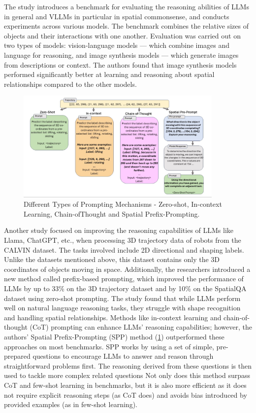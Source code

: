 The study \cite{liu2022things} introduces a benchmark for evaluating the reasoning abilities of LLMs in general and VLLMs in particular in spatial commonsense, and conducts experiments across various models. 
The benchmark combines the relative sizes of objects and their interactions with one another. Evaluation was carried out on two types of models: vision-language models — which combine images and language for reasoning, 
and image synthesis models — which generate images from descriptions or context. The authors found that image synthesis models performed significantly better at learning and reasoning about spatial relationships compared to the other models.


\begin{figure}
    \centering
    \includegraphics[width=0.9\textwidth]{Figs/SPP.png}
    \caption{Different Types of Prompting Mechanisms - Zero-shot, In-context Learning, Chain-ofThought and Spatial Prefix-Prompting.}
    \label{fig:spp}
\end{figure}

Another study \cite{sharma2023exploring} focused on improving the reasoning capabilities of LLMs like Llama, ChatGPT, etc., when processing 3D trajectory data of robots from the CALVIN dataset. The tasks involved include 2D directional and shaping labels. 
Unlike the datasets mentioned above, this dataset contains only the 3D coordinates of objects moving in space. Additionally, the researchers introduced a new method called prefix-based prompting, which improved the performance of LLMs by up to 33\% on the 3D trajectory dataset 
and by 10\% on the SpatialQA dataset using zero-shot prompting. The study found that while LLMs perform well on natural language reasoning tasks, they struggle with shape recognition and handling spatial relationships. Methods like in-context learning and chain-of-thought (CoT) prompting can enhance LLMs' reasoning capabilities; however, 
the authors’ Spatial Prefix-Prompting (SPP) method (\ref{fig:spp}) outperformed these approaches on most benchmarks. SPP works by using a set of simple, pre-prepared questions to encourage LLMs to answer and reason through straightforward problems first. The reasoning derived from these questions is then used to tackle more complex related questions
Not only does this method surpass CoT and few-shot learning in benchmarks, but it is also more efficient as it does not require explicit reasoning steps (as CoT does) and avoids bias introduced by provided examples (as in few-shot learning). 



